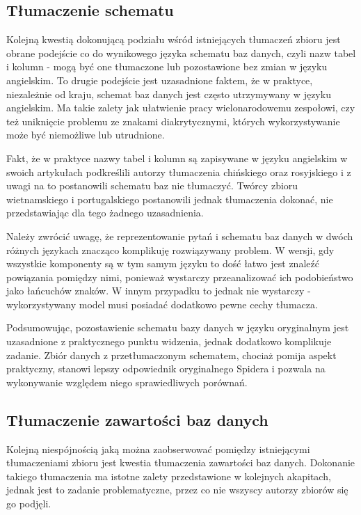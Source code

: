 \subsection{Tłumaczenie schematu}
Kolejną kwestią dokonującą podziału wśród istniejących tłumaczeń zbioru  jest obrane podejście co do wynikowego języka schematu baz danych, czyli nazw tabel i kolumn - mogą być one tłumaczone lub pozostawione bez zmian w języku angielskim. To drugie podejście jest uzasadnione faktem, że w praktyce, niezależnie od kraju, schemat baz danych jest często utrzymywany w języku angielskim. Ma takie zalety jak ułatwienie pracy wielonarodowemu zespołowi, czy też uniknięcie problemu ze znakami diakrytycznymi, których wykorzystywanie może być niemożliwe lub utrudnione.

Fakt, że w praktyce nazwy tabel i kolumn są zapisywane w języku angielskim w swoich artykułach podkreślili autorzy tłumaczenia chińskiego oraz rosyjskiego i z uwagi na to postanowili schematu baz nie tłumaczyć. Twórcy zbioru wietnamskiego i portugalskiego postanowili jednak tłumaczenia dokonać, nie przedstawiając dla tego żadnego uzasadnienia.

Należy zwrócić uwagę, że reprezentowanie pytań i schematu baz danych w dwóch różnych językach znacząco komplikuję rozwiązywany problem. W wersji, gdy wszystkie komponenty są w tym samym języku to dość łatwo jest znaleźć powiązania pomiędzy nimi, ponieważ wystarczy przeanalizować ich podobieństwo jako łańcuchów znaków. W innym przypadku to jednak nie wystarczy - wykorzystywany model musi posiadać dodatkowo pewne cechy tłumacza.

Podsumowując, pozostawienie schematu bazy danych w języku oryginalnym jest uzasadnione z praktycznego punktu widzenia, jednak dodatkowo komplikuje zadanie. Zbiór danych z przetłumaczonym schematem, chociaż pomija aspekt praktyczny, stanowi lepszy odpowiednik oryginalnego Spidera i pozwala na wykonywanie względem niego sprawiedliwych porównań.

\subsection{Tłumaczenie zawartości baz danych}
Kolejną niespójnością jaką można zaobserwować pomiędzy istniejącymi tłumaczeniami zbioru  jest kwestia tłumaczenia zawartości baz danych. Dokonanie takiego tłumaczenia ma istotne zalety przedstawione w kolejnych akapitach, jednak jest to zadanie problematyczne, przez co nie wszyscy autorzy zbiorów się go podjęli.

